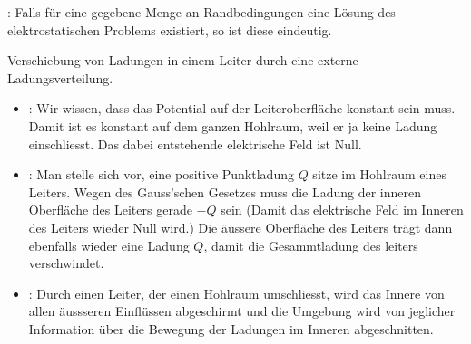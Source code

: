 \vspace{1\baselineskip}

:
Falls für eine gegebene Menge an Randbedingungen eine Lösung des elektrostatischen
Problems existiert, so ist diese eindeutig.

\vspace{1\baselineskip}

Verschiebung von Ladungen in einem Leiter durch eine externe Ladungsverteilung.

\vspace{1\baselineskip}

\begin{itemize}
    \item {}: Wir wissen, dass das Potential
            auf der Leiteroberfläche konstant sein muss. Damit ist es konstant auf dem ganzen
            Hohlraum, weil er ja keine Ladung einschliesst. Das dabei entstehende elektrische
            Feld ist Null.
    \item {}: Man stelle sich vor, eine positive
            Punktladung $Q$ sitze im Hohlraum eines Leiters. Wegen des Gauss'schen Gesetzes
            muss die Ladung der inneren Oberfläche des Leiters gerade $-Q$ sein
            (Damit das elektrische Feld im Inneren des Leiters wieder Null wird.)
            Die äussere Oberfläche des Leiters trägt dann ebenfalls wieder eine Ladung $Q$,
            damit die Gesammtladung des leiters verschwindet.
    \item {}: Durch einen Leiter, der einen Hohlraum umschliesst, wird das
            Innere von allen äussseren Einflüssen abgeschirmt und die Umgebung wird von
            jeglicher Information über die Bewegung der Ladungen im Inneren abgeschnitten.
\end{itemize}
